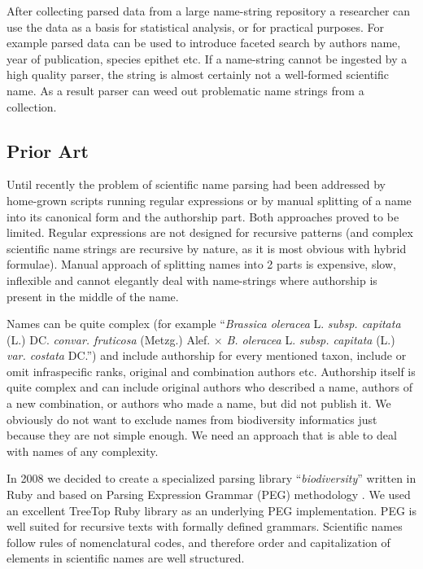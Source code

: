 \documentclass{bmcart}
\begin{document}
After collecting parsed data from a large name-string repository a researcher
can use the data as a basis for statistical analysis, or for practical
purposes. For example parsed data can be used to introduce faceted search by
authors name, year of publication, species epithet etc. If a name-string cannot
be ingested by a high quality parser, the string is almost certainly not a
well-formed scientific name. As a result parser can weed out problematic name
strings from a collection.

\subsection*{Prior Art}

Until recently the problem of scientific name parsing had been addressed by
home-grown scripts running regular expressions or by manual splitting of a name
into its canonical form and the authorship part. Both approaches proved to be
limited. Regular expressions are not designed for recursive patterns (and
complex scientific name strings are recursive by nature, as it is most obvious
with hybrid formulae). Manual approach of splitting names into 2 parts is
expensive, slow, inflexible and cannot elegantly deal with name-strings where
authorship is present in the middle of the name.

Names can be quite complex (for example ``\textit{Brassica oleracea} L.
\textit{subsp.  capitata} (L.) DC. \textit{convar. fruticosa} (Metzg.) Alef.
$\times$ \textit{B. oleracea} L.  \textit{subsp. capitata} (L.) \textit{var.
costata} DC.'')  and include authorship for every mentioned taxon, include or
omit infraspecific ranks, original and combination authors etc. Authorship
itself is quite complex and can include original authors who described a name,
authors of a new combination, or authors who made a name, but did not publish
it. We obviously do not want to exclude names from biodiversity informatics
just because they are not simple enough. We need an approach that is able to
deal with names of any complexity.

In 2008 we decided to create a specialized parsing library
``\textit{biodiversity}'' \cite{biodiversity} written in Ruby and based on
Parsing Expression Grammar (PEG) methodology \cite{Ford2004}. We used an
excellent TreeTop Ruby library \cite{treetop} as an underlying PEG
implementation. PEG is well suited for recursive texts with formally defined
grammars. Scientific names follow rules of nomenclatural codes, and therefore
order and capitalization of elements in scientific names are well structured.
\end{document}
